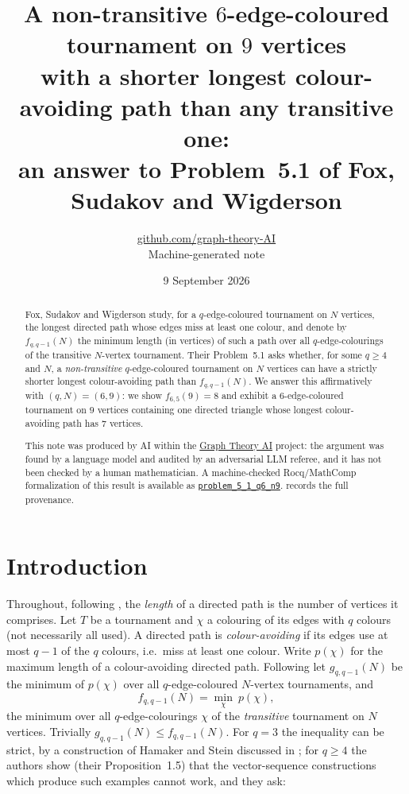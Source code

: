 \documentclass[11pt,a4paper]{article}
\title{A non-transitive $6$-edge-coloured tournament on $9$ vertices\\ with a shorter longest colour-avoiding path than any transitive one:\\ an answer to Problem~5.1 of Fox, Sudakov and Wigderson}
\author{\href{https://github.com/graph-theory-AI}{github.com/graph-theory-AI}\\[2pt] \normalsize Machine-generated note}
\date{9 September 2026}
\theoremstyle{plain}
\theoremstyle{definition}
\theoremstyle{remark}
\newcommand{\col}{\chi}
\newcommand{\pth}{p}
\begin{document}
\maketitle


\begin{abstract}
Fox, Sudakov and Wigderson study, for a $q$-edge-coloured tournament on $N$ vertices, the longest directed path whose edges miss at least one colour, and denote by $f_{q,q-1}(N)$ the minimum length (in vertices) of such a path over all $q$-edge-colourings of the transitive $N$-vertex tournament. Their Problem~5.1 asks whether, for some $q\ge4$ and $N$, a \emph{non-transitive} $q$-edge-coloured tournament on $N$ vertices can have a strictly shorter longest colour-avoiding path than $f_{q,q-1}(N)$. We answer this affirmatively with $(q,N)=(6,9)$: we show $f_{6,5}(9)=8$ and exhibit a $6$-edge-coloured tournament on $9$ vertices containing one directed triangle whose longest colour-avoiding path has $7$ vertices.

\medskip\noindent\small
This note was produced by AI within the \href{https://github.com/graph-theory-AI/Graph-Theory-LLM-Proofs}{Graph Theory AI} project:
the argument was found by a language model and audited by an adversarial LLM
referee, and it has not been checked by a human mathematician.
A machine-checked Rocq/MathComp formalization of this result is available as
\href{https://github.com/LLM4Rocq/graph-theory-rocq/blob/main/digraph-theory/theories/applications/color_avoiding_tournament.v}{\texttt{problem\_5\_1\_q6\_n9}}.
 records the full provenance.

\end{abstract}

\section{Introduction}

Throughout, following \cite{FSW25}, the \emph{length} of a directed path is the number of vertices it comprises. Let $T$ be a tournament and $\col$ a colouring of its edges with $q$ colours (not necessarily all used). A directed path is \emph{colour-avoiding} if its edges use at most $q-1$ of the $q$ colours, i.e.\ miss at least one colour. Write $\pth(\col)$ for the maximum length of a colour-avoiding directed path. Following \cite{FSW25} let $g_{q,q-1}(N)$ be the minimum of $\pth(\col)$ over all $q$-edge-coloured $N$-vertex tournaments, and
\[
 f_{q,q-1}(N)=\min_{\col}\ \pth(\col),
\]
the minimum over all $q$-edge-colourings $\col$ of the \emph{transitive} tournament on $N$ vertices. Trivially $g_{q,q-1}(N)\le f_{q,q-1}(N)$. For $q=3$ the inequality can be strict, by a construction of Hamaker and Stein discussed in \cite{FSW25}; for $q\ge4$ the authors show (their Proposition~1.5) that the vector-sequence constructions which produce such examples cannot work, and they ask:
\end{document}
